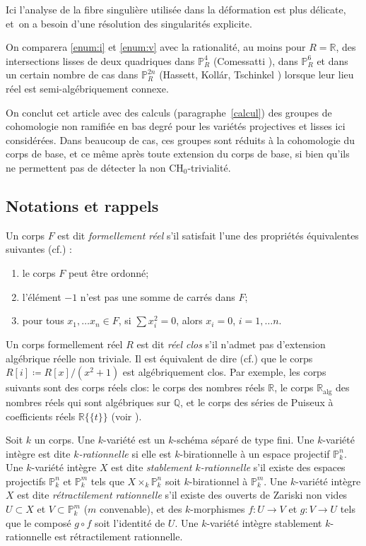 \documentclass[11pt]{article}
\newcommand{\cf}{cf.\xspace}
\newenvironment{enumeratei}
{\bgroup\def\theenumi{\roman{enumi}}\def\theenumii{\arabic{enumii}}\begin{enumerate}}
{\end{enumerate}\egroup}
\newcommand{\alg}{\mathrm{alg}}
\newcommand{\CH}{\mathrm{CH}}
\theoremstyle{definition}
\newcommand{\R}{\mathbb R}
\renewcommand{\P}{\mathbb P}
\newcommand{\puiseux}{\mathbb{R}\{\!\{t\}\!\}}
\begin{document}
Ici l'analyse de la fibre singulière utilisée dans la déformation est plus délicate, et~on a besoin d'une résolution des singularités explicite.

On comparera \eqref{enum:i} et \eqref{enum:v} avec la rationalité, au moins pour $R=\R$, des intersections lisses de deux quadriques dans $\P^4_R$ (Comessatti \cite{comessatti1912fondamenti}), dans $\P^6_{R}$ et dans
un certain nombre de cas dans $\P^{2n}_R$ (Hassett, Kollár, Tschinkel \cite{hassett2022rationality}) lorsque leur lieu réel est semi-algébriquement connexe.

On conclut cet article avec des calculs (paragraphe~\ref{calcul}) des groupes de cohomologie non ramifiée en bas degré pour les variétés projectives et lisses ici considérées. Dans beaucoup de cas, ces groupes sont réduits à la cohomologie du corps de base, et ce même
après toute extension du corps de base,
si bien qu'ils ne permettent pas de détecter la non $\CH_0$-trivialité.

\subsection*{Notations et rappels}
Un corps $F$ est dit {\it formellement réel} s'il satisfait l'une des propriétés équivalentes suivantes (\cf \cite[Th.\,1.1.8]{bochnak1998real}) :
\begin{enumeratei}
\item
le corps $F$ peut être ordonné;
\item
l'élément $-1$ n'est pas une somme de carrés dans $F$;
\item
pour tous $x_1,\ldots x_n\in F$, si $\sum x_i^2=0$, alors $x_i=0$, $i=1,\ldots n$.
\end{enumeratei}

Un corps formellement réel $R$ est dit {\it réel clos} s'il n'admet pas d'extension algébrique réelle non triviale. Il est équivalent de dire (\cf \cite[Th.\,1.2.2]{bochnak1998real}) que le corps $R[i]\coloneqq R[x]/(x^2+1)$ est algébriquement clos.
Par exemple, les corps suivants sont des corps réels clos: le corps des nombres réels $\mathbb R$, le corps $\mathbb R_{\alg}$ des nombres réels qui sont algébriques sur $\mathbb Q$, et le corps des séries de Puiseux à coefficients réels $\puiseux$ (voir \cite[Ex.\,1.2.3]{bochnak1998real}).

\medskip

Soit $k$ un corps.
Une $k$-variété est un $k$-schéma séparé de type fini. Une $k$-variété intègre
est dite {\it $k$-rationnelle} si elle est $k$-birationnelle à un espace projectif $\P^n_{k}$.
Une $k$-variété intègre $X$ est dite {\it stablement $k$-rationnelle} s'il existe des espaces projectifs
$\P^n_{k}$ et $\P^m_{k}$ tels que $X \times_{k}\P^n_{k}$ soit $k$-birationnel à $\P^m_{k}$.
Une $k$-variété intègre $X$ est dite {\it rétractilement rationnelle}
s'il existe des ouverts de Zariski non vides $U \subset X$ et $V \subset \P^m_{k}$ ($m$ convenable),
et des $k$-morphismes $ f \colon U \to V$ et $g \colon V \to U$ tels que le composé $g \circ f$ soit l'identité de $U$.
Une $k$-variété intègre stablement $k$-rationnelle est rétractilement rationnelle.
\end{document}
